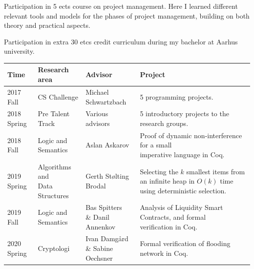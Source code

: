 \begin{fullwidth}

  Participation in 5 ects course on project management.
  Here I learned different relevant tools and models for the phases of project management, building on both theory and practical aspects.
  
  \vspace{11pt}

  Participation in extra 30 etcs credit curriculum during my bachelor at Aarhus university.

  \medskip

  \renewcommand{\arraystretch}{1.3}
  \begin{tabular}{llll}
    Time & Research area & Advisor & Project \\ \hline
    2017 Fall   & CS Challenge & Michael Schwartzbach & 5 programming projects. \\
    2018 Spring & Pre Talent Track & Various advisors & 5 introductory projects to the research groups. \\
    2018 Fall   & Logic and Semantics & Aslan Askarov & \makecell[tl]{Proof of dynamic non-interference for a small \\ \quad imperative language in Coq.} \\
    2019 Spring & \makecell[tl]{Algorithms and \\ \quad Data Structures} & Gerth Stølting Brodal & \makecell[tl]{Selecting the $k$ smallest items from an infinite heap \\ \quad in $O(k)$ time using deterministic selection.} \\
    2019 Fall   & Logic and Semantics & \makecell[tl]{Bas Spitters \\ \quad \& Danil Annenkov} & \makecell[tl]{Analysis of Liquidity Smart Contracts, and formal \\ \quad verification in Coq.} \\
    2020 Spring & Cryptologi & \makecell[tl]{Ivan Damgård \\ \quad \& Sabine Oechsner} & Formal verification of flooding network in Coq.
  \end{tabular}
\end{fullwidth}


